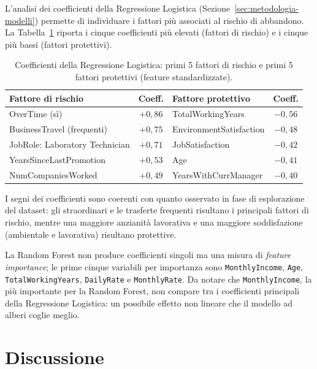 \documentclass{article}
\begin{document}
L'analisi dei coefficienti della Regressione Logistica (Sezione~\ref{sec:metodologia-modelli}) permette di individuare i fattori più associati al rischio di abbandono. La Tabella~\ref{tab:coefficienti} riporta i cinque coefficienti più elevati (fattori di rischio) e i cinque più bassi (fattori protettivi).

\begin{table}[h]
\centering
\small
\begin{tabular}{l c l c}
\hline
\textbf{Fattore di rischio} & \textbf{Coeff.} & \textbf{Fattore protettivo} & \textbf{Coeff.} \\
\hline
OverTime (sì)                        & $+0,86$ & TotalWorkingYears        & $-0,56$ \\
BusinessTravel (frequenti)           & $+0,75$ & EnvironmentSatisfaction  & $-0,48$ \\
JobRole: Laboratory Technician       & $+0,71$ & JobSatisfaction          & $-0,42$ \\
YearsSinceLastPromotion              & $+0,53$ & Age                      & $-0,41$ \\
NumCompaniesWorked                   & $+0,49$ & YearsWithCurrManager     & $-0,40$ \\
\hline
\end{tabular}
\caption{Coefficienti della Regressione Logistica: primi 5 fattori di rischio e primi 5 fattori protettivi (feature standardizzate).}
\label{tab:coefficienti}
\end{table}

\noindent I segni dei coefficienti sono coerenti con quanto osservato in fase di esplorazione del dataset: gli straordinari e le trasferte frequenti risultano i principali fattori di rischio, mentre una maggiore anzianità lavorativa e una maggiore soddisfazione (ambientale e lavorativa) risultano protettive.

\noindent La Random Forest non produce coefficienti singoli ma una misura di \emph{feature importance}; le prime cinque variabili per importanza sono \texttt{MonthlyIncome}, \texttt{Age}, \texttt{TotalWorkingYears}, \texttt{DailyRate} e \texttt{MonthlyRate}. Da notare che \texttt{MonthlyIncome}, la più importante per la Random Forest, non compare tra i coefficienti principali della Regressione Logistica: un possibile effetto non lineare che il modello ad alberi coglie meglio.


\newpage
\section{Discussione}
 
\end{document}
